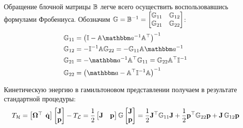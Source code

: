 Обращение блочной матрицы $\mathbb{B}$ легче всего осуществить воспользовавшись формулами Фробениуса. Обозначим $\mathbb{G} = \mathbb{B}^{-1} = \begin{bmatrix} \mathbb{G}_{11} & \mathbb{G}_{12} \\ \mathbb{G}_{21} & \mathbb{G}_{22} \end{bmatrix}$:
\vverh
\begin{gather}
	\begin{aligned}
		\bbG_{11} &= \lb \bbI - \bbA \bba^{-1} \bbA^\top \rb^{-1} \\
		\bbG_{12} &= - \bbI^{-1} \bbA \bbG_{22} = - \bbG_{11} \bbA \bba^{-1} \\
		\bbG_{21} &= - \bba^{-1} \bbA^\top \bbG_{11} = \bbG_{22} \bbA^\top \bbI^{-1} \\
		\bbG_{22} &= \lb \bba - \bbA^\top \bbI^{-1} \bbA \rb^{-1}
	\end{aligned} \notag
\end{gather}

Кинетическую энергию в гамильтоновом представлении получаем в результате стандартной процедуры:
\vverh
\begin{gather}
	T_\mH = 
	\begin{bmatrix}
		\mf{\Omega}^\top & \hspace*{-2mm} \dot{\mf{q}}
	\end{bmatrix}
	\begin{bmatrix}
		\mf{J} \\
		\mf{p}
	\end{bmatrix}
	- T_\mL = \frac{1}{2} 
	\begin{bmatrix}
		\mf{J} & \mf{p}
	\end{bmatrix}
	\bbG
	\begin{bmatrix}
		\mf{J} \\
		\mf{p}
	\end{bmatrix} = 
	\frac{1}{2} \mf{J}^\top \bbG_{11} \mf{J} + \frac{1}{2} \mf{p}^\top \bbG_{22} \mf{p} + \mf{J} \, \bbG_{12} \mf{p} \notag
\end{gather}


